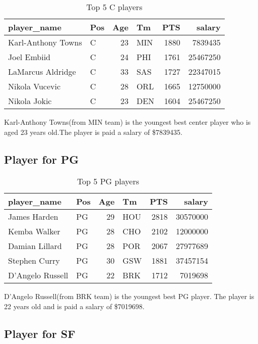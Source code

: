 \documentclass[
]{article}
\begin{document}
\begin{table}[!h]

\caption{\label{tab:unnamed-chunk-16}Top 5 C players}
\centering
\begin{tabular}[t]{l|l|r|l|r|r}
\hline
player\_name & Pos & Age & Tm & PTS & salary\\
\hline
Karl-Anthony Towns & C & 23 & MIN & 1880 & 7839435\\
\hline
Joel Embiid & C & 24 & PHI & 1761 & 25467250\\
\hline
LaMarcus Aldridge & C & 33 & SAS & 1727 & 22347015\\
\hline
Nikola Vucevic & C & 28 & ORL & 1665 & 12750000\\
\hline
Nikola Jokic & C & 23 & DEN & 1604 & 25467250\\
\hline
\end{tabular}
\end{table}

Karl-Anthony Towns(from MIN team) is the youngest best center player who
is aged 23 years old.The player is paid a salary of \$7839435.

\hypertarget{player-for-pg}{%
\subsection{Player for PG}\label{player-for-pg}}

\begin{table}[!h]

\caption{\label{tab:unnamed-chunk-17}Top 5 PG players}
\centering
\begin{tabular}[t]{l|l|r|l|r|r}
\hline
player\_name & Pos & Age & Tm & PTS & salary\\
\hline
James Harden & PG & 29 & HOU & 2818 & 30570000\\
\hline
Kemba Walker & PG & 28 & CHO & 2102 & 12000000\\
\hline
Damian Lillard & PG & 28 & POR & 2067 & 27977689\\
\hline
Stephen Curry & PG & 30 & GSW & 1881 & 37457154\\
\hline
D'Angelo Russell & PG & 22 & BRK & 1712 & 7019698\\
\hline
\end{tabular}
\end{table}

D'Angelo Russell(from BRK team) is the youngest best PG player. The
player is 22 years old and is paid a salary of \$7019698.

\hypertarget{player-for-sf}{%
\subsection{Player for SF}\label{player-for-sf}}
\end{document}
